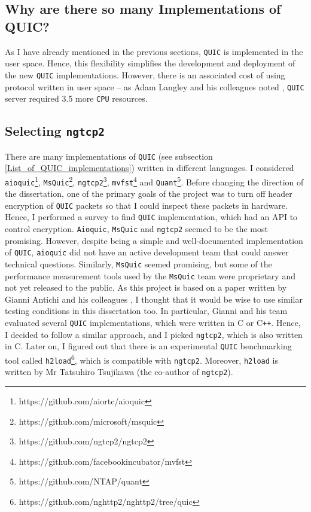 \documentclass[12pt,a4paper,twoside,openright]{report}
\begin{document}
\subsection{Why are there so many Implementations of QUIC?}

As I have already mentioned in the previous sections, \texttt{QUIC} is implemented in the user space.
Hence, this flexibility simplifies the development and deployment of the new \texttt{QUIC} implementations.
However, there is an associated cost of using protocol written in user space -- as Adam Langley and his colleagues noted \cite{QUIC_SERVER_REQUIRES_3-5_more_CPU_resources}, \texttt{QUIC} server required 3.5 more \texttt{CPU} resources.

\subsection{Selecting  \texttt{ngtcp2}}
There are many implementations of \texttt{QUIC} (see subsection \ref{List_of_QUIC_implementations}) written in different languages.
I considered  \texttt{aioquic}\footnote{https://github.com/aiortc/aioquic},  \texttt{MsQuic}\footnote{https://github.com/microsoft/msquic},  \texttt{ngtcp2}\footnote{https://github.com/ngtcp2/ngtcp2},  \texttt{mvfst}\footnote{https://github.com/facebookincubator/mvfst} and \texttt{Quant}\footnote{https://github.com/NTAP/quant}.
Before changing the direction of the dissertation, one of the primary goals of the project was to turn off header encryption of \texttt{QUIC} packets so that I could inspect these packets in hardware.
Hence, I performed a survey to find \texttt{QUIC} implementation, which had an API to control encryption. 
\texttt{Aioquic}, \texttt{MsQuic} and \texttt{ngtcp2} seemed to be the most promising.
However, despite being a simple and well-documented implementation of \texttt{QUIC}, \texttt{aioquic} did not have an active development team that could answer technical questions.
Similarly, \texttt{MsQuic} seemed promising, but some of the performance measurement tools used by the \texttt{MsQuic} team were proprietary and not yet released to the public.
As this project is based on a paper written by Gianni Antichi and his colleagues \cite{Making_QUIC_Quicker}, I thought that it would be wise to use similar testing conditions in this dissertation too.
In particular, Gianni and his team evaluated several \texttt{QUIC} implementations, which were written in C or C\texttt{++}.
Hence, I decided to follow a similar approach, and I picked \texttt{ngtcp2}, which is also written in C.
Later on, I figured out that there is an experimental \texttt{QUIC} benchmarking tool called \texttt{h2load}\footnote{https://github.com/nghttp2/nghttp2/tree/quic}, which is compatible with \texttt{ngtcp2}.
Moreover, \texttt{h2load} is written by Mr Tatsuhiro  Tsujikawa (the co-author of \texttt{ngtcp2}).
\end{document}
